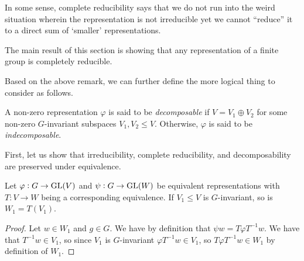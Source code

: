 			In some sense, complete reducibility says that we do not run into the weird situation wherein the representation is not irreducible yet we cannot ``reduce'' it to a direct sum of `smaller' representations.

			The main result of this section is showing that any representation of a finite group is completely reducible.

			Based on the above remark, we can further define the more logical thing to consider as follows.

			\begin{fdef}[Decomposability]
				A non-zero representation $\varphi$ is said to be \emph{decomposable} if $V = V_1 \oplus V_2$ for some non-zero $G$-invariant subspaces $V_1,V_2 \le V$. Otherwise, $\varphi$ is said to be \emph{indecomposable}.
			\end{fdef}

			First, let us show that irreducibility, complete reducibility, and decomposability are preserved under equivalence.

			\begin{lemma}
				Let $\varphi : G \to \operatorname{GL}(V)$ and $\psi : G \to \operatorname{GL}(W)$ be equivalent representations with $T : V \to W$ being a corresponding equivalence. If $V_1 \le V$ is $G$-invariant, so is $W_1 = T(V_1)$.
			\end{lemma}
			\begin{proof}
				Let $w \in W_1$ and $g \in G$. We have by definition that $\psi w = T\varphi T^{-1}w$. We have that $T^{-1} w \in V_1$, so since $V_1$ is $G$-invariant $\varphi T^{-1} w \in V_1$, so $T \varphi T^{-1} w \in W_1$ by definition of $W_1$.
			\end{proof}


